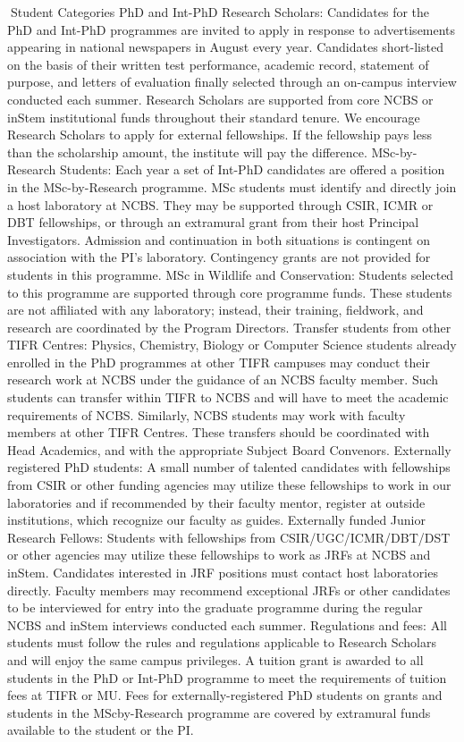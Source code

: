 \documentclass[a4paper,10pt]{article}
\begin{document}
Student Categories
PhD and Int-PhD Research Scholars: Candidates for the PhD and Int-PhD programmes
are invited to apply in response to advertisements appearing in national newspapers in
August every year. Candidates short-listed on the basis of their written test performance,
academic record, statement of purpose, and letters of evaluation finally selected through an
on-campus interview conducted each summer. Research Scholars are supported from core
NCBS or inStem institutional funds throughout their standard tenure. We encourage
Research Scholars to apply for external fellowships. If the fellowship pays less than the
scholarship amount, the institute will pay the difference.
MSc-by-Research Students: Each year a set of Int-PhD candidates are offered a position in
the MSc-by-Research programme. MSc students must identify and directly join a host
laboratory at NCBS. They may be supported through CSIR, ICMR or DBT fellowships, or
through an extramural grant from their host Principal Investigators. Admission and
continuation in both situations is contingent on association with the PI’s laboratory.
Contingency grants are not provided for students in this programme.
MSc in Wildlife and Conservation: Students selected to this programme are supported
through core programme funds. These students are not affiliated with any laboratory;
instead, their training, fieldwork, and research are coordinated by the Program Directors.
Transfer students from other TIFR Centres: Physics, Chemistry, Biology or Computer
Science students already enrolled in the PhD programmes at other TIFR campuses may
conduct their research work at NCBS under the guidance of an NCBS faculty member. Such
students can transfer within TIFR to NCBS and will have to meet the academic requirements
of NCBS. Similarly, NCBS students may work with faculty members at other TIFR Centres.
These transfers should be coordinated with Head Academics, and with the appropriate
Subject Board Convenors.
Externally registered PhD students: A small number of talented candidates with
fellowships from CSIR or other funding agencies may utilize these fellowships to work in
our laboratories and if recommended by their faculty mentor, register at outside institutions,
which recognize our faculty as guides.
Externally funded Junior Research Fellows: Students with fellowships from
CSIR/UGC/ICMR/DBT/DST or other agencies may utilize these fellowships to work as
JRFs at NCBS and inStem. Candidates interested in JRF positions must contact host
laboratories directly. Faculty members may recommend exceptional JRFs or other
candidates to be interviewed for entry into the graduate programme during the regular
NCBS and inStem interviews conducted each summer.
Regulations and fees: All students must follow the rules and regulations applicable to
Research Scholars and will enjoy the same campus privileges. A tuition grant is awarded to
all students in the PhD or Int-PhD programme to meet the requirements of tuition fees at
TIFR or MU. Fees for externally-registered PhD students on grants and students in the MScby-Research programme are covered by extramural funds available to the student or the PI.
	
\end{document}
